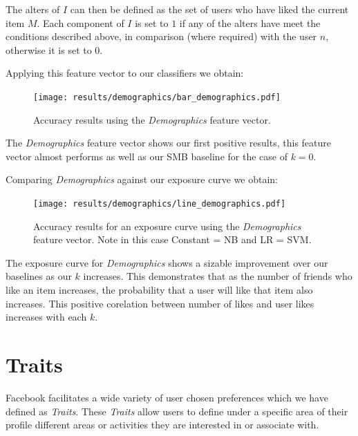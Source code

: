 The alters of $I$ can then be defined as the set of users who have liked the current item $M$.
Each component of $I$ is set to $1$ if any of the alters have meet the conditions described above, in comparison (where required) 
with the user $n$, otherwise it is set to $0$.

\clearpage

Applying this feature vector to our classifiers we obtain:

\begin{figure}[h]
	\begin{center}
		\texttt{[image: results/demographics/bar\_demographics.pdf]}
		\caption{Accuracy results using the \emph{Demographics} feature vector.}
	\end{center}
\end{figure}

The \emph{Demographics} feature vector shows our first positive results, this feature vector almost performs as well as our 
SMB baseline for the case of $k = 0$.

\clearpage
	
Comparing \emph{Demographics} against our exposure curve we obtain:
	
\begin{figure}[h]
	\begin{center}
		\texttt{[image: results/demographics/line\_demographics.pdf]}
		\caption{Accuracy results for an exposure curve using the \emph{Demographics} feature vector. Note in this case Constant = NB and LR = SVM.}
	\end{center}
\end{figure}

The exposure curve for \emph{Demographics} shows a sizable improvement over our baselines as our $k$ increases. This demonstrates that as the
number of friends who like an item increases, the probability that a user will like that item also increases. This positive corelation between
number of likes and user likes increases with each $k$.

\section{Traits}
\label{sec:traits}

Facebook facilitates a wide variety of user chosen preferences which we have defined as \emph{Traits}. 
These \emph{Traits} allow users to define under a specific area of their profile different areas or activities they are interested in 
or associate with.

